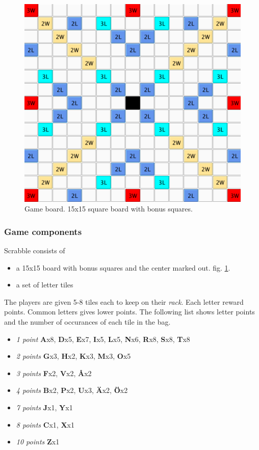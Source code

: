 \documentclass[a4paper, 12pt]{report}
\begin{document}
\begin{figure}[h]
\centering
\includegraphics[scale=0.5]{board}
\caption {Game board. 15x15 square board with bonus squares.}
\label{fig:game-board}
\end{figure}

\subsubsection{Game components}
Scrabble consists of 

\begin{itemize}
\item a 15x15 board with bonus squares and the center marked out. fig. \ref{fig:game-board}.
\item a set of letter tiles
\end{itemize}

The players are given 5-8 tiles each to keep on their \emph{rack}. Each letter reward points. Common letters gives lower points. The following list shows letter points and the number of occurances of each tile in the bag.

\begin{itemize}
	\item{\emph{1 point}} \textbf{A}x8, \textbf{D}x5, \textbf{E}x7, \textbf{I}x5, \textbf{L}x5, \textbf{N}x6, \textbf{R}x8, \textbf{S}x8, \textbf{T}x8
	\item{\emph{2 points}} \textbf{G}x3, \textbf{H}x2, \textbf{K}x3, \textbf{M}x3, \textbf{O}x5
	\item{\emph{3 points}} \textbf{F}x2, \textbf{V}x2, \textbf{Å}x2
	\item{\emph{4 points}} \textbf{B}x2, \textbf{P}x2, \textbf{U}x3, \textbf{Ä}x2, \textbf{Ö}x2
	\item{\emph{7 points}} \textbf{J}x1, \textbf{Y}x1
	\item{\emph{8 points}} \textbf{C}x1, \textbf{X}x1
	\item{\emph{10 points}} \textbf{Z}x1
\end{itemize}
\end{document}
